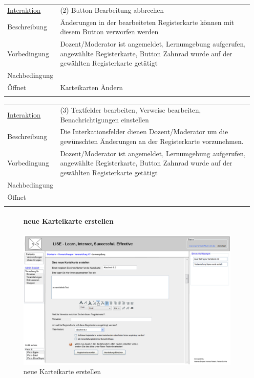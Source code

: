 \documentclass[12pt,a4paper]{article}
\begin{document}
{\begin{tabular}{l p{12cm}}
\underline{Interaktion} & (2)  Button Bearbeitung  abbrechen  \\ 
Beschreibung   	 		& Änderungen in der bearbeiteten Registerkarte können mit diesem Button verworfen werden\\
Vorbedingung	 		& Dozent/Moderator ist angemeldet, Lernumgebung aufgerufen, angewählte Registerkarte, Button Zahnrad wurde auf der gewählten Registerkarte getätigt\\
Nachbedingung	 		& \\
Öffnet			 		& \glqq  Karteikarten Ändern\grqq \\\\
\end{tabular}

\begin{tabular}{l p{12cm}}
\underline{Interaktion} & (3) Textfelder bearbeiten, Verweise bearbeiten, Benachrichtigungen einstellen  \\ 
Beschreibung   	 		& Die Interkationsfelder dienen Dozent/Moderator um die gewünschten Änderungen an der Registerkarte vorzunehmen. \\
Vorbedingung	 		& Dozent/Moderator ist angemeldet, Lernumgebung aufgerufen, angewählte Registerkarte, Button Zahnrad wurde auf der gewählten Registerkarte getätigt\\
Nachbedingung	 		& \\
Öffnet			 		&  \\\\
\end{tabular}

\begin{figure}[H]
	\centering
	\paragraph{neue Karteikarte erstellen}
	\includegraphics[width=\textwidth]{Bilder/Mockups/GUI/neueKarteikarte[ModeratorAdmin].png}
	\caption{neue Karteikarte erstellen}
	\label{GuineueKarteikarteerstellen}
\end{figure}

}
\end{document}
